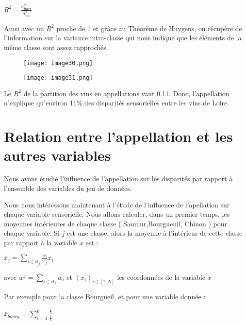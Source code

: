 \documentclass{article}
\begin{document}
\begin{center}
    \textbf{$R^2 = \frac{\sigma^2_{\text{inter}}}{\sigma^2_{\text{tot}}}$}
\end{center}

Ainsi avec un  $R^{2}$
  proche de  1
  et grâce au Théorème de Huygens, on récupère de l'information sur la variance intra-classe qui nous indique que les éléments de la même classe sont assez rapprochés.

\begin{figure}[H]
    \centering
    \texttt{[image: image30.png]}
    \label{fig:enter-label}
\end{figure}

\begin{figure}[H]
    \centering
    \texttt{[image: image31.png]}
    \label{fig:enter-label}
\end{figure}

Le  $R^{2}$
  de la partition des vins en appellations vaut 0.11. Donc, l'appellation n'explique qu'environ 11\%
  des disparités sensorielles entre les vins de Loire.

  \section{Relation entre l'appellation et les autres variables}

  Nous avons étudié l'influence de l'appellation sur les disparités par rapport à l'ensemble des variables du jeu de données.

Nous nous intéressons maintenant à l'étude de l'influence de l'apellation sur chaque variable sensorielle.
Nous allons calculer, dans un premier temps, les moyennes intérieures de chaque classe ( Saumur,Bourgueuil, Chinon )
pour chaque variable. Si \textbf{$j$} est une classe, alors la moyenne à l'intérieur de cette classe par rapport à la variable \textbf{$x$} est : 

\begin{center}
    \textbf{$\bar{x}_j = \sum_{i \in \text{cl}_j}\frac{w_{i}}{w_{j}}x_{i}$}
\end{center}

avec $w^j = \sum_{i \in \text{cl}_j}w_i$ et $(x_i)_{i \in [1,N]}$ les coordonnées de la variable $x$

Par exemple pour la classe Bourgueil, et pour une variable donnée :

\begin{center}
    \textbf{$\bar{x}_{bourg} = \sum_{i=1}^{6}\frac{\frac{1}{6}}{\frac{1}{6}}$}
\end{center}
\end{document}
